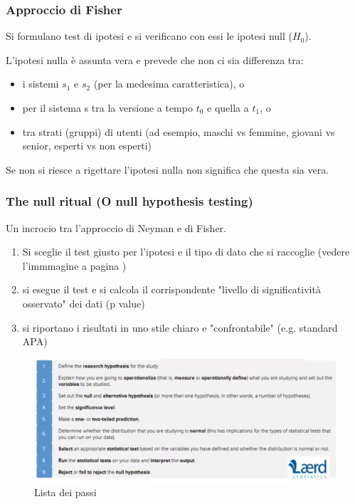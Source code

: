 \documentclass[11pt,a4paper]{book}
\begin{document}
\subsubsection{Approccio di Fisher}
Si formulano test di ipotesi e si verificano con essi le ipotesi null ($H_0$).

L'ipotesi nulla è assunta vera e prevede che non ci sia differenza tra:
\begin{itemize}
	\item i sistemi $s_1$ e $s_2$ (per la medesima caratteristica), o
	\item per il sistema s tra la versione a tempo $t_0$ e quella a $t_1$, o
	\item tra strati (gruppi) di utenti (ad esempio, maschi vs femmine, giovani vs senior, esperti vs non esperti)
\end{itemize}

Se non si riesce a rigettare l'ipotesi nulla non significa che questa sia vera.

\subsubsection{The null ritual (O null hypothesis testing)}
Un incrocio tra l'approccio di Neyman e di Fisher.
\begin{enumerate}
	\item Si sceglie il test giusto per l'ipotesi e il tipo di dato che si raccoglie (vedere l'immmagine a pagina \pageref{fig: 024})
	\item si esegue il test e si calcola il corrispondente "livello di significatività osservato" dei dati (p value)
	\item si riportano i risultati in uno stile chiaro e "confrontabile" (e.g. standard APA)
\end{enumerate}

\begin{figure}[h!]
	\begin{center}
		\includegraphics[scale=0.6]{img/028.jpg}
		\caption{Lista dei passi}
		\label{fig: 028}
	\end{center}
\end{figure}
\end{document}
